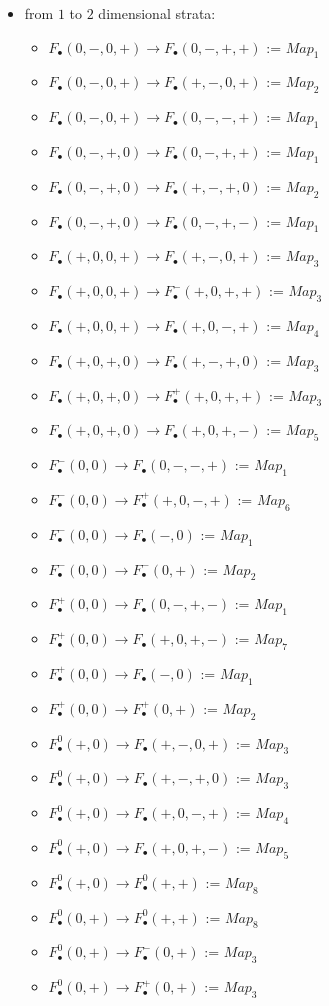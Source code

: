 \begin{itemize}
\item from $1$ to $2$ dimensional strata:
\begin{itemize}
\item $F_\bullet(0,-,0,+)\rightarrow F_\bullet(0,-,+,+)$ := $Map_1$
\item $F_\bullet(0,-,0,+)\rightarrow F_\bullet(+,-,0,+)$ := $Map_2$
\item $F_\bullet(0,-,0,+)\rightarrow F_\bullet(0,-,-,+)$ := $Map_1$
\item $F_\bullet(0,-,+,0)\rightarrow F_\bullet(0,-,+,+)$ := $Map_1$
\item $F_\bullet(0,-,+,0)\rightarrow F_\bullet(+,-,+,0)$ := $Map_2$
\item $F_\bullet(0,-,+,0)\rightarrow F_\bullet(0,-,+,-)$ := $Map_1$
\item $F_\bullet(+,0,0,+)\rightarrow F_\bullet(+,-,0,+)$ := $Map_3$
\item $F_\bullet(+,0,0,+)\rightarrow F_\bullet^-(+,0,+,+)$ := $Map_3$
\item $F_\bullet(+,0,0,+)\rightarrow F_\bullet(+,0,-,+)$ := $Map_4$
\item $F_\bullet(+,0,+,0)\rightarrow F_\bullet(+,-,+,0)$ := $Map_3$
\item $F_\bullet(+,0,+,0)\rightarrow F_\bullet^+(+,0,+,+)$ := $Map_3$
\item $F_\bullet(+,0,+,0)\rightarrow F_\bullet(+,0,+,-)$ := $Map_5$
\item $F_\bullet^-(0,0)\rightarrow F_\bullet(0,-,-,+)$ := $Map_1$
\item $F_\bullet^-(0,0)\rightarrow F_\bullet^+(+,0,-,+)$ := $Map_6$
\item $F_\bullet^-(0,0)\rightarrow F_\bullet(-,0)$ := $Map_1$
\item $F_\bullet^-(0,0)\rightarrow F_\bullet^-(0,+)$ := $Map_2$
\item $F_\bullet^+(0,0)\rightarrow F_\bullet(0,-,+,-)$ := $Map_1$
\item $F_\bullet^+(0,0)\rightarrow F_\bullet(+,0,+,-)$ := $Map_7$
\item $F_\bullet^+(0,0)\rightarrow F_\bullet(-,0)$ := $Map_1$
\item $F_\bullet^+(0,0)\rightarrow F_\bullet^+(0,+)$ := $Map_2$
\item $F_\bullet^0(+,0)\rightarrow F_\bullet(+,-,0,+)$ := $Map_3$
\item $F_\bullet^0(+,0)\rightarrow F_\bullet(+,-,+,0)$ := $Map_3$
\item $F_\bullet^0(+,0)\rightarrow F_\bullet(+,0,-,+)$ := $Map_4$
\item $F_\bullet^0(+,0)\rightarrow F_\bullet(+,0,+,-)$ := $Map_5$
\item $F_\bullet^0(+,0)\rightarrow F_\bullet^0(+,+)$ := $Map_8$
\item $F_\bullet^0(0,+)\rightarrow F_\bullet^0(+,+)$ := $Map_8$
\item $F_\bullet^0(0,+)\rightarrow F_\bullet^-(0,+)$ := $Map_3$
\item $F_\bullet^0(0,+)\rightarrow F_\bullet^+(0,+)$ := $Map_3$
\end{itemize}


\end{itemize}
